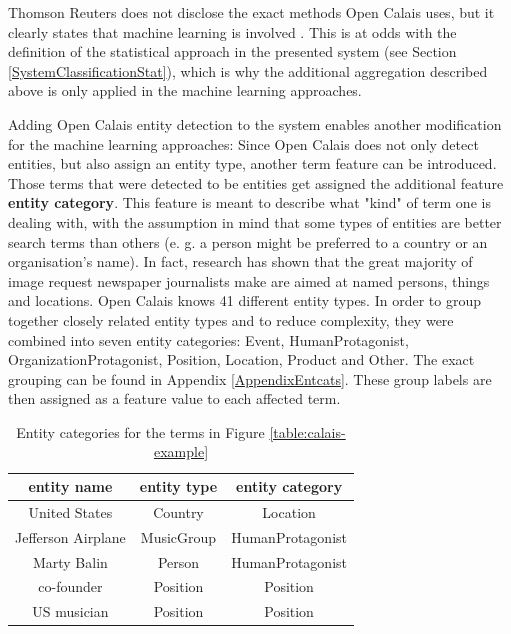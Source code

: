 \documentclass[11pt,a4paper,twoside]{article}
\begin{document}
Thomson Reuters does not disclose the exact methods Open Calais uses, but it clearly states that machine learning is involved \cite{ThomsonReuters2018ThomsonGuide}. This is at odds with the definition of the statistical approach in the presented system (see Section \ref{SystemClassificationStat}), which is why the additional aggregation described above is only applied in the machine learning approaches.

\bigskip

Adding Open Calais entity detection to the system enables another modification for the machine learning approaches: Since Open Calais does not only detect entities, but also assign an entity type, another term feature can be introduced. Those terms that were detected to be entities get assigned the additional feature \textbf{entity category}. This feature is meant to describe what "kind" of term one is dealing with, with the assumption in mind that some types of entities are better search terms than others (e. g. a person might be preferred to a country or an organisation's name). In fact, research has shown that the great majority of image request newspaper journalists make are aimed at named persons, things and locations. \cite[p. 106]{Westman2006ImageContext} Open Calais knows 41 different entity types. In order to group together closely related entity types and to reduce complexity, they were combined into seven entity categories: Event, HumanProtagonist, OrganizationProtagonist, Position, Location, Product and Other. The exact grouping can be found in Appendix \ref{AppendixEntcats}. These group labels are then assigned as a feature value to each affected term.

\begin{table}[b]
    \caption{Entity categories for the terms in Figure \ref{table:calais-example}}
    \centering
    \begin{tabular}{|c|c|c|}
        \hline
        \textbf{entity name} & \textbf{entity type} & \textbf{entity category} \\
        \hline
        United States & Country & Location \\
        Jefferson Airplane & MusicGroup & HumanProtagonist \\
        Marty Balin & Person & HumanProtagonist \\
        co-founder & Position & Position \\
        US musician & Position & Position \\
        \hline 
    \end{tabular}
    \label{table:entcat-example}
\end{table}
\end{document}
